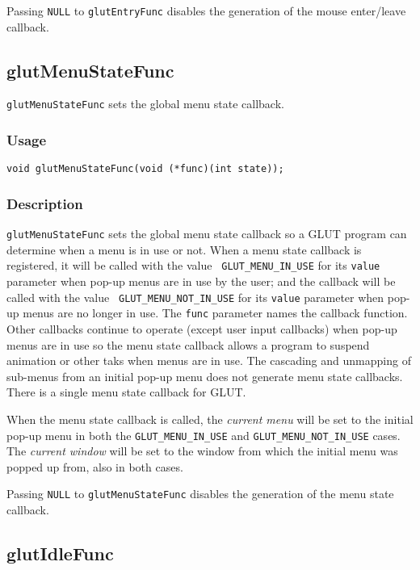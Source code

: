 Passing {\tt NULL} to {\tt glutEntryFunc}
disables the generation of the mouse enter/leave callback.

\subsection{glutMenuStateFunc}

{\tt glutMenuStateFunc} sets the global menu state callback.

\subsubsection*{Usage}
\begin{verbatim}
void glutMenuStateFunc(void (*func)(int state));
\end{verbatim}

\subsubsection*{Description}

{\tt glutMenuStateFunc} sets the global menu state callback so a GLUT
program can determine when a menu is in use or not.  When a menu state
callback is registered, it will be called with the value {\tt
GLUT\_MENU\_IN\_USE} for its {\tt value} parameter when pop-up menus are
in use by the user; and the callback will be called with the value {\tt
GLUT\_MENU\_NOT\_IN\_USE} for its {\tt value} parameter when pop-up menus
are no longer in use.  The {\tt func} parameter names the callback
function.  Other callbacks continue to operate (except user input
callbacks) when pop-up menus are in use so the menu state callback
allows a program to suspend animation or other taks when menus are in
use.  The cascading and unmapping of sub-menus from an initial pop-up
menu does not generate menu state callbacks.  There is
a single menu state callback for GLUT.

When the menu state callback is called, the {\em current menu} will be
set to the initial pop-up menu in both the {\tt GLUT\_MENU\_IN\_USE} and
{\tt GLUT\_MENU\_NOT\_IN\_USE} cases.  The {\em current window} will be
set to the window from which the initial menu was popped up from,
also in both cases.

Passing {\tt NULL} to {\tt glutMenuStateFunc}
disables the generation of the menu state callback.

\subsection{glutIdleFunc}

